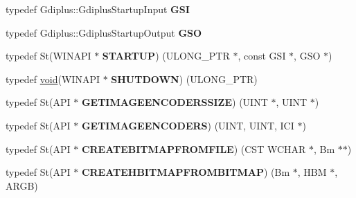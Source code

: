 \begin{DoxyCompactItemize}
\item 
\mbox{\label{struct_a_t_l_1_1_c_image_1_1_c_o_m_m_o_n_a293fefaaa1e44418bda6155e75187702}} 
typedef Gdiplus\+::\+Gdiplus\+Startup\+Input {\bfseries G\+SI}
\item 
\mbox{\label{struct_a_t_l_1_1_c_image_1_1_c_o_m_m_o_n_a0d4ac499f67334bf43b692ea595d4cd3}} 
typedef Gdiplus\+::\+Gdiplus\+Startup\+Output {\bfseries G\+SO}
\item 
\mbox{\label{struct_a_t_l_1_1_c_image_1_1_c_o_m_m_o_n_a59e4cb7ad99ad8b03e49e4827eb7e8c2}} 
typedef St(W\+I\+N\+A\+PI $\ast$ {\bfseries S\+T\+A\+R\+T\+UP}) (U\+L\+O\+N\+G\+\_\+\+P\+TR $\ast$, const G\+SI $\ast$, G\+SO $\ast$)
\item 
\mbox{\label{struct_a_t_l_1_1_c_image_1_1_c_o_m_m_o_n_a9ceced7596dfc133b08a8d4244ea25d3}} 
typedef \hyperlink{interfacevoid}{void}(W\+I\+N\+A\+PI $\ast$ {\bfseries S\+H\+U\+T\+D\+O\+WN}) (U\+L\+O\+N\+G\+\_\+\+P\+TR)
\item 
\mbox{\label{struct_a_t_l_1_1_c_image_1_1_c_o_m_m_o_n_aef6310dc550700e7cf284b3debb7e5c0}} 
typedef St(A\+PI $\ast$ {\bfseries G\+E\+T\+I\+M\+A\+G\+E\+E\+N\+C\+O\+D\+E\+R\+S\+S\+I\+ZE}) (U\+I\+NT $\ast$, U\+I\+NT $\ast$)
\item 
\mbox{\label{struct_a_t_l_1_1_c_image_1_1_c_o_m_m_o_n_a1216699a434b5b293ab044d0b08b0f64}} 
typedef St(A\+PI $\ast$ {\bfseries G\+E\+T\+I\+M\+A\+G\+E\+E\+N\+C\+O\+D\+E\+RS}) (U\+I\+NT, U\+I\+NT, I\+CI $\ast$)
\item 
\mbox{\label{struct_a_t_l_1_1_c_image_1_1_c_o_m_m_o_n_a8e41bd43d3e2e8fbe54ce6d2d4120953}} 
typedef St(A\+PI $\ast$ {\bfseries C\+R\+E\+A\+T\+E\+B\+I\+T\+M\+A\+P\+F\+R\+O\+M\+F\+I\+LE}) (C\+ST W\+C\+H\+AR $\ast$, Bm $\ast$$\ast$)
\item 
\mbox{\label{struct_a_t_l_1_1_c_image_1_1_c_o_m_m_o_n_a67e73bc876a0491cede18575aa432074}} 
typedef St(A\+PI $\ast$ {\bfseries C\+R\+E\+A\+T\+E\+H\+B\+I\+T\+M\+A\+P\+F\+R\+O\+M\+B\+I\+T\+M\+AP}) (Bm $\ast$, H\+BM $\ast$, A\+R\+GB)
$$
\end{DoxyCompactItemize}
